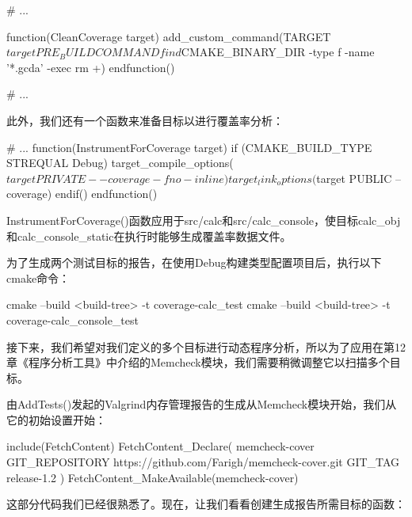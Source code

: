 \begin{cmake}
# ...

function(CleanCoverage target)
    add_custom_command(TARGET ${target} PRE_BUILD COMMAND
        find ${CMAKE_BINARY_DIR} -type f
        -name '*.gcda' -exec rm {} +)
endfunction()

# ...
\end{cmake}

此外，我们还有一个函数来准备目标以进行覆盖率分析：


\begin{cmake}
# ...
function(InstrumentForCoverage target)
    if (CMAKE_BUILD_TYPE STREQUAL Debug)
        target_compile_options(${target}
                               PRIVATE --coverage -fno-inline)
        target_link_options(${target} PUBLIC --coverage)
    endif()
endfunction()
\end{cmake}

InstrumentForCoverage()函数应用于src/calc和src/calc\_console，使目标calc\_obj和calc\_console\_static在执行时能够生成覆盖率数据文件。

为了生成两个测试目标的报告，在使用Debug构建类型配置项目后，执行以下cmake命令：

\begin{shell}
cmake --build <build-tree> -t coverage-calc_test
cmake --build <build-tree> -t coverage-calc_console_test
\end{shell}

接下来，我们希望对我们定义的多个目标进行动态程序分析，所以为了应用在第12章《程序分析工具》中介绍的Memcheck模块，我们需要稍微调整它以扫描多个目标。


由AddTests()发起的Valgrind内存管理报告的生成从Memcheck模块开始，我们从它的初始设置开始：


\begin{cmake}
include(FetchContent)
FetchContent_Declare(
    memcheck-cover
    GIT_REPOSITORY https://github.com/Farigh/memcheck-cover.git
    GIT_TAG release-1.2
)
FetchContent_MakeAvailable(memcheck-cover)
\end{cmake}

这部分代码我们已经很熟悉了。现在，让我们看看创建生成报告所需目标的函数：


